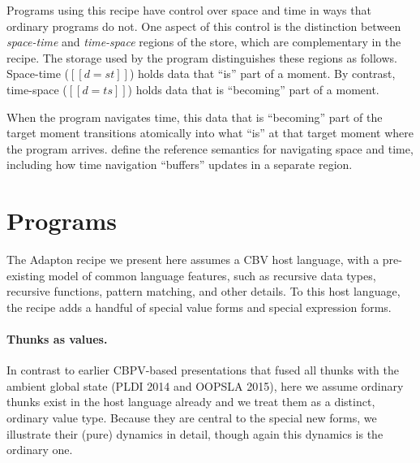 \documentclass[11pt]{article}
\begin{document}
\nolinenumbers
\ottgrammartabular{
  {\makeLineNumber\stepLineNumber} \ottSpace
  \\
   {\makeLineNumber\stepLineNumber} \ottMoment
  \\
   {\makeLineNumber\stepLineNumber} \ottp
  \\
   {\makeLineNumber\stepLineNumber} \ottpp
  \\
  {\makeLineNumber\stepLineNumber} \ottd
}
\linenumbers

Programs using this recipe have control over space and time in ways
that ordinary programs do not.
%
One aspect of this control is the distinction between
\emph{space-time} and \emph{time-space} regions of the store, which are complementary in
the recipe.
%
The storage used by the program distinguishes these regions as follows.
%
Space-time ($[[d = st]]$) holds data that ``is'' part of a moment.
By contrast,
time-space ($[[d = ts]]$) holds data that is ``becoming'' part of a moment.

When the program navigates time, this data that is ``becoming'' part
of the target moment transitions atomically into what ``is'' at that
target moment where the program arrives.
%
define the reference semantics for navigating space and time, including
how time navigation ``buffers'' updates in a separate region.


\section{Programs}
\label{sec:programs}

The Adapton recipe we present here assumes a CBV host language, with a
pre-existing model of common language features, such as recursive data
types, recursive functions, pattern matching, and other details.
%
To this host language, the recipe adds a handful of special value
forms and special expression forms.

\paragraph{Thunks as values.}
In contrast to earlier CBPV-based presentations that fused all thunks
with the ambient global state (PLDI 2014 and OOPSLA 2015), here we
assume ordinary thunks exist in the host language already and we treat
them as a distinct, ordinary value type.
%
Because they are central to the special new forms, we illustrate their
(pure) dynamics in detail, though again this dynamics is the ordinary one.
\end{document}
